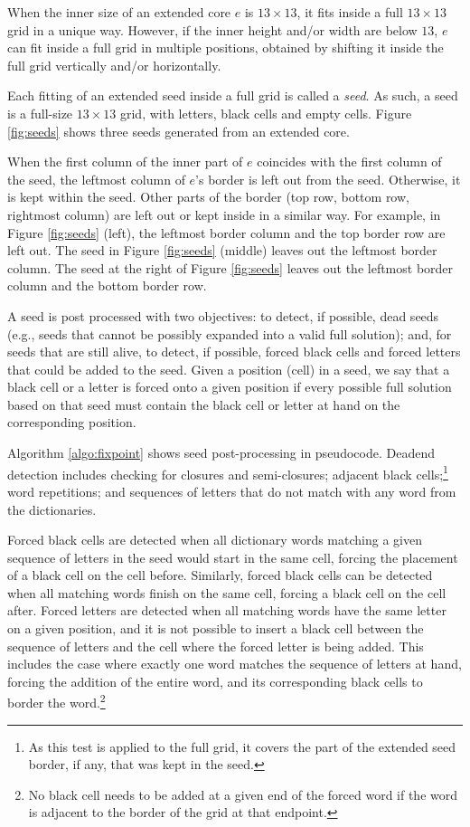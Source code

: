 When the inner size of an extended core $e$ is $13 \times 13$, it fits inside a full $13 \times 13$ grid in a unique way. However,
if the inner height and/or width are below $13$, $e$ can fit inside a full grid in multiple positions,
obtained by shifting it inside the full grid vertically and/or horizontally.

Each fitting of an extended seed inside a full grid is called a \emph{seed}.
As such, a seed is a full-size $13 \times 13$ grid, with 
letters, black cells and empty cells.
Figure \ref{fig:seeds} shows three seeds generated from an extended core.

When the first column of the inner part of $e$ coincides 
with the first column of the seed, the leftmost column of $e$'s border
is left out from the seed. 
Otherwise, it is kept within the seed.
Other parts of the border (top row, bottom row, rightmost column)
are left out or kept inside in a similar way.
For example, in Figure \ref{fig:seeds} (left), the leftmost border column 
and the top border row are left out.
The seed in Figure \ref{fig:seeds} (middle) leaves out the
leftmost border column.
The seed at the right of Figure \ref{fig:seeds} leaves out
the leftmost border column and the bottom border row.


A seed is post processed with two objectives: to detect, if possible, dead seeds 
(e.g., seeds that cannot be possibly expanded into a valid full solution); 
and, for seeds that are still alive, to detect, if possible, 
forced black cells and forced letters that could be added to the seed.
Given a position (cell) in a seed,
we say that a black cell or a letter is forced onto a 
given position if 
every possible full solution based on that seed must contain 
the black cell or letter at hand on the corresponding position.

Algorithm \ref{algo:fixpoint} shows seed post-processing in pseudocode.
Deadend detection includes checking for closures and semi-closures;
adjacent black cells;\footnote{As this test is applied to the full
grid, it covers the part of the extended seed border, if any, that was
kept in the seed.}
word repetitions; and
sequences of letters that do not match with any word from the dictionaries.

Forced black cells are detected when all dictionary words matching 
a given sequence of letters in the seed would start in the same cell,
forcing the placement of a black cell on the cell before.
Similarly, forced black cells can be detected when 
all matching words finish on the same cell, forcing a black cell 
on the cell after.
Forced letters are detected when all matching words have the same 
letter on a given position, and it is not possible to insert
a black cell between the sequence of letters and the cell where
the forced letter is being added. 
This includes the case
where exactly one word matches the sequence of letters at hand,
forcing the addition of the entire word, and its corresponding
black cells to border the word.\footnote{No black cell needs to be added
at a given end of the forced word if the word 
is adjacent to the border of the grid at that endpoint.}

